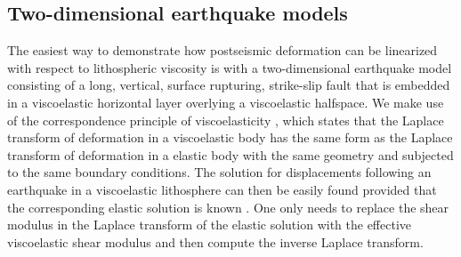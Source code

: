 \documentclass[extra]{gji}
\begin{document}
\subsection{Two-dimensional earthquake models}
The easiest way to demonstrate how postseismic deformation can be
linearized with respect to lithospheric viscosity is with a
two-dimensional earthquake model consisting of a long, vertical,
surface rupturing, strike-slip fault that is embedded in a
viscoelastic horizontal layer overlying a viscoelastic halfspace.  We
make use of the correspondence principle of viscoelasticity
\citep[e.g.][]{F1975}, which states that the Laplace transform of
deformation in a viscoelastic body has the same form as the Laplace
transform of deformation in a elastic body with the same geometry and
subjected to the same boundary conditions. The solution for
displacements following an earthquake in a viscoelastic lithosphere
can then be easily found provided that the corresponding elastic
solution is known \citep[e.g.][]{NM1974,SP1978,HH2005}.  One only
needs to replace the shear modulus in the Laplace transform of the
elastic solution with the effective viscoelastic shear modulus and
then compute the inverse Laplace transform.
\end{document}
